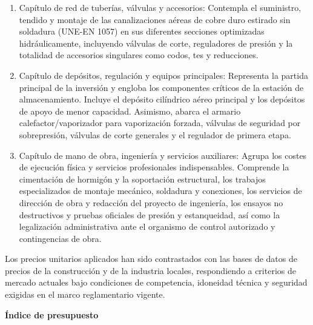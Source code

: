\documentclass[12pt]{article}
\begin{document}
        \begin{enumerate}
            \item Capítulo de red de tuberías, válvulas y accesorios: 
            Contempla el suministro, tendido y montaje de las canalizaciones aéreas de cobre duro estirado sin soldadura (UNE-EN 1057) en sus diferentes secciones optimizadas hidráulicamente, incluyendo válvulas de corte, reguladores de presión y la totalidad de accesorios singulares como codos, tes y reducciones.
            
            \item Capítulo de depósitos, regulación y equipos principales: 
            Representa la partida principal de la inversión y engloba los componentes críticos de la estación de almacenamiento. Incluye el depósito cilíndrico aéreo principal y los depósitos de apoyo de menor capacidad. Asimismo, abarca el armario calefactor/vaporizador para vaporización forzada, válvulas de seguridad por sobrepresión, válvulas de corte generales y el regulador de primera etapa.
            
            \item Capítulo de mano de obra, ingeniería y servicios auxiliares: 
            Agrupa los costes de ejecución física y servicios profesionales indispensables. Comprende la cimentación de hormigón y la soportación estructural, los trabajos especializados de montaje mecánico, soldadura y conexiones, los servicios de dirección de obra y redacción del proyecto de ingeniería, los ensayos no destructivos y pruebas oficiales de presión y estanqueidad, así como la legalización administrativa ante el organismo de control autorizado y contingencias de obra.
        \end{enumerate}

        Los precios unitarios aplicados han sido contrastados con las bases de datos de precios de la construcción y de la industria locales, respondiendo a criterios de mercado actuales bajo condiciones de competencia, idoneidad técnica y seguridad exigidas en el marco reglamentario vigente.

        \clearpage

        \clearpage
        \thispagestyle{empty}
        \vspace*{\fill}
        \begin{center}
            {\fontsize{16pt}{16pt}\selectfont\bfseries Índice de presupuesto}
        \end{center}
        \vspace*{\fill}
        \clearpage
\end{document}

